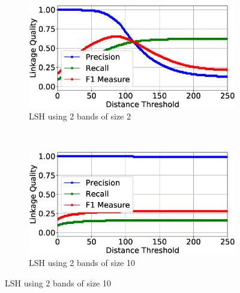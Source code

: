 \documentclass{llncs}
\begin{document}
\begin{figure}
\begin{subfigure}{.47\textwidth}
  \centering
\includegraphics[width=\textwidth]{figures/plotLQ-cora-lsh-2-2}
\vspace{-6mm}
\caption{LSH using 2 bands of size 2}
\end{subfigure}%
~~
\begin{subfigure}{.47\textwidth}
  \centering
\includegraphics[width=\textwidth]{figures/plotLQ-cora-lsh-2-10}
\vspace{-6mm}
\caption{LSH using 2 bands of size 10}
\end{subfigure} \vspace{4mm}


\end{figure}
\end{document}
